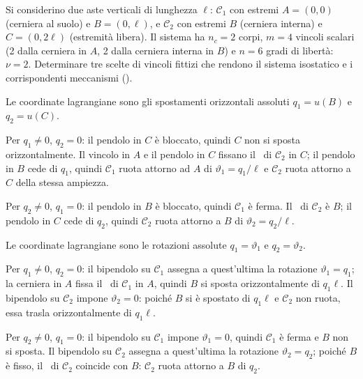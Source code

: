 \begin{esempio}
	\label{ex:scelte_fittizi}
	Si considerino due aste verticali di lunghezza $\ell$:
	$\mathcal{C}_1$ con estremi $A = (0,0)$ (cerniera al
	suolo) e $B = (0,\ell)$, e $\mathcal{C}_2$ con estremi
	$B$ (cerniera interna) e $C = (0, 2\ell)$ (estremità
	libera). Il sistema ha $n_c = 2$ corpi, $m = 4$
	vincoli scalari (2 dalla cerniera in $A$, 2 dalla
	cerniera interna in $B$) e $n = 6$ gradi di libertà:
	$\nu = 2$. Determinare tre scelte di vincoli fittizi
	che rendono il sistema isostatico e i corrispondenti
	meccanismi ().
	



	\begin{svolgimento}
		
		Le coordinate lagrangiane sono gli spostamenti
		orizzontali assoluti $q_1 = u(B)$ e $q_2 = u(C)$.
		
		Per $q_1 \neq 0$, $q_2 = 0$: il pendolo in $C$ è
		bloccato, quindi $C$ non si sposta orizzontalmente.
		Il vincolo in $A$ e il pendolo in $C$ fissano il
		\CRa\ di $\mathcal{C}_2$ in $C$; il pendolo in $B$
		cede di $q_1$, quindi $\mathcal{C}_1$ ruota attorno
		ad $A$ di $\vartheta_1 = q_1/\ell$ e $\mathcal{C}_2$
		ruota attorno a $C$ della stessa ampiezza.
		
		Per $q_2 \neq 0$, $q_1 = 0$: il pendolo in $B$ è
		bloccato, quindi $\mathcal{C}_1$ è ferma. Il \CRa\
		di $\mathcal{C}_2$ è $B$; il pendolo in $C$ cede di
		$q_2$, quindi $\mathcal{C}_2$ ruota attorno a $B$ di
		$\vartheta_2 = q_2/\ell$.
		
		Le coordinate lagrangiane sono le rotazioni assolute
		$q_1 = \vartheta_1$ e $q_2 = \vartheta_2$.
		
		Per $q_1 \neq 0$, $q_2 = 0$: il bipendolo su
		$\mathcal{C}_1$ assegna a quest'ultima la rotazione
		$\vartheta_1 = q_1$; la cerniera in $A$ fissa il
		\CRa\ di $\mathcal{C}_1$ in $A$, quindi $B$ si
		sposta orizzontalmente di $q_1\ell$. Il bipendolo
		su $\mathcal{C}_2$ impone $\vartheta_2 = 0$: poiché
		$B$ si è spostato di $q_1\ell$ e $\mathcal{C}_2$
		non ruota, essa trasla orizzontalmente di $q_1\ell$.
		
		Per $q_2 \neq 0$, $q_1 = 0$: il bipendolo su
		$\mathcal{C}_1$ impone $\vartheta_1 = 0$, quindi
		$\mathcal{C}_1$ è ferma e $B$ non si sposta. Il
		bipendolo su $\mathcal{C}_2$ assegna a quest'ultima
		la rotazione $\vartheta_2 = q_2$; poiché $B$ è
		fisso, il \CRa\ di $\mathcal{C}_2$ coincide con
		$B$: $\mathcal{C}_2$ ruota attorno a $B$ di $q_2$.
		

\end{svolgimento}
\end{esempio}
